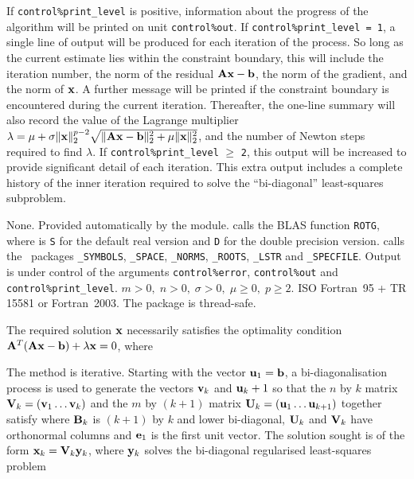 \documentclass{galahad}
\newcommand{\packagename}{L2\-RT}
\begin{document}

\galinfo
If {\tt control\%print\_level} is positive, information about the progress
of the algorithm will be printed on unit {\tt control\-\%\-out}.
If {\tt control\%print\_level = 1}, a single line of output will be produced
for each iteration of the process. So long as the current estimate lies
within the constraint boundary, this will include
the iteration number, the norm of the residual ${\mathbf{A}}{\mathbf{x}}-{\mathbf{b}}$, the
norm of the gradient, and the norm of ${\mathbf{x}}$.
A further message will be printed
if the constraint boundary is encountered during the current iteration.
Thereafter, the one-line summary will also record the value of the Lagrange
multiplier
$\lambda = \mu + \sigma \|{\mathbf{x}}\|_2^{p-2}
 \sqrt{\| {\mathbf{A}} {\mathbf{x}} - {\mathbf{b}} \|_2^2 + \mu \|{\mathbf{x}}\|_2^2}$,
and the number of Newton steps required to find $\lambda$.
If {\tt control\%print\_level} $\geq$ {\tt 2}, this
output will be increased to provide significant detail of each iteration.
This extra output includes a complete history of the inner iteration required
to solve the ``bi-diagonal'' least-squares subproblem.


\galgeneral

\galcommon None.
\galworkspace Provided automatically by the module.
\galroutines {\tt \packagename\_solve} calls the
BLAS function {\tt *ROTG}, where {\tt *} is {\tt S} for
the default real version and {\tt D} for the double precision version.
\galmodules {\tt \packagename\_solve} calls the \galahad\ packages
{\tt \libraryname\_SY\-M\-BOLS},
{\tt \libraryname\_SPACE},
{\tt \libraryname\_NORMS},
{\tt \libraryname\_\-ROOTS},
{\tt \libraryname\_LSTR} and
{\tt \libraryname\_SPECFILE}.
\galio Output is under control of the arguments
{\tt control\%error}, {\tt control\%out} and {\tt control\%print\_level}.
\galrestrictions $m > 0, \; n  >  0, \;  \sigma  >  0,  \;
 \mu  \geq  0, \; p \geq 2$.
\galportability ISO Fortran~95 + TR 15581 or Fortran~2003.
The package is thread-safe.


\galmethod
The required solution ${\mathbf{x}}$ necessarily satisfies the optimality condition
${\mathbf{A}}^T ( {\mathbf{A}} {\mathbf{x}} - {\mathbf{b}} ) + \lambda {\mathbf{x}} = 0$, where

\noindent
The method is iterative. Starting  with the vector ${\mathbf{u}}_1 = {\mathbf{b}}$, a
bi-diagonalisation process is used to generate the vectors ${\mathbf{v}}_k$ and
${\mathbf{u}}_k+1$ so that the $n$ by $k$ matrix ${\mathbf{V}}_k = ( {\mathbf{v}}_1 \ldots {\mathbf{v}}_k)$
and the $m$ by $(k+1)$ matrix ${\mathbf{U}}_k = ( {\mathbf{u}}_1 \ldots {\mathbf{u}}_{k+1})$
together satisfy
where ${\mathbf{B}}_k$ is $(k+1)$ by $k$ and lower bi-diagonal, ${\mathbf{U}}_k$ and
${\mathbf{V}}_k$ have orthonormal columns and ${\mathbf{e}}_1$ is the first unit vector.
The solution sought is of the form ${\mathbf{x}}_k = {\mathbf{V}}_k {\mathbf{y}}_k$, where ${\mathbf{y}}_k$
solves the bi-diagonal regularised least-squares problem
\end{document}
